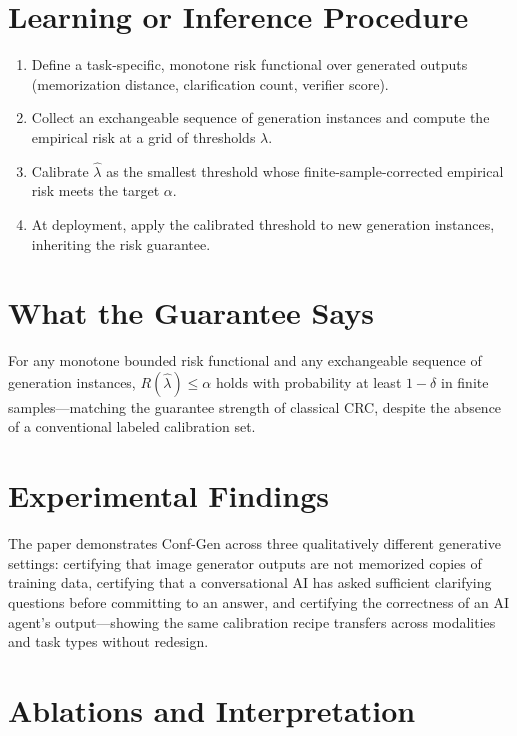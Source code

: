 \documentclass[10pt,twocolumn]{article}
\begin{document}
\section{Learning or Inference Procedure}

\begin{enumerate}[itemsep=2pt,parsep=0pt]
  \item Define a task-specific, monotone risk functional over generated
    outputs (memorization distance, clarification count, verifier
    score).
  \item Collect an exchangeable sequence of generation instances and
    compute the empirical risk at a grid of thresholds $\lambda$.
  \item Calibrate $\hat\lambda$ as the smallest threshold whose
    finite-sample-corrected empirical risk meets the target $\alpha$.
  \item At deployment, apply the calibrated threshold to new generation
    instances, inheriting the risk guarantee.
\end{enumerate}

\section{What the Guarantee Says}

For any monotone bounded risk functional and any exchangeable sequence
of generation instances, $R(\hat\lambda) \le \alpha$ holds with
probability at least $1-\delta$ in finite samples---matching the
guarantee strength of classical CRC, despite the absence of a
conventional labeled calibration set.

\section{Experimental Findings}

The paper demonstrates Conf-Gen across three qualitatively different
generative settings: certifying that image generator outputs are not
memorized copies of training data, certifying that a conversational AI
has asked sufficient clarifying questions before committing to an
answer, and certifying the correctness of an AI agent's output---showing
the same calibration recipe transfers across modalities and task types
without redesign.

\section{Ablations and Interpretation}
\end{document}
